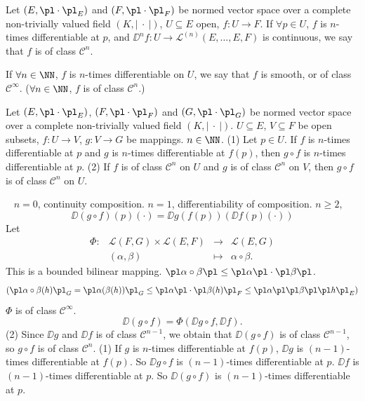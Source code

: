 \begin{definitionenv}
    Let $(E,\pl\cdot\pl_E)$ and $(F,\pl\cdot\pl_F)$ be normed vector space over a complete non-trivially valued field $(K,\left| \ \cdot\ \right|)$, $U\subseteq E$ open, $f:U\longrightarrow F$. If $\forall p\in U$, $f$ is $n$-times differentiable at $p$, and $\DD^n f: U\longrightarrow \mathscr{L}^{(n)}(E,\ldots,E,F)$ is continuous, we say that $f$ is of class $\mathcal{C}^n$.

    \quad If $\forall n\in \NN$, $f$ is $n$-times differentiable on $U$, we say that $f$ is smooth, or of class $\mathcal{C}^\infty$. ($\forall n\in \NN$, $f$ is of class $\mathcal{C}^n$.)
\end{definitionenv}
\begin{propositionenv}
   Let $(E,\pl\cdot\pl_E)$, $(F,\pl\cdot\pl_F)$ and $(G,\pl\cdot\pl_G)$ be normed vector space over a complete non-trivially valued field $(K,\left| \ \cdot\ \right|)$. $U\subseteq E$, $V\subseteq F$ be open subsets, $f: U\longrightarrow V$, $g:V\longrightarrow G$ be mappings. $n\in\NN$.
   \newline
   (1) Let $p\in U$. If $f$ is $n$-times differentiable at $p$ and $g$ is $n$-times differentiable at $f(p)$, then $g\circ f$ is $n$-times differentiable at $p$.
   \newline
   (2) If $f$ is of class $\mathcal{C}^{n}$ on $U$ and $g$ is of class $\mathcal{C}^n$ on $V$, then $g\circ f$ is of class $\mathcal{C}^n$ on $U$.
\end{propositionenv}
\begin{proofenv}[induction on $n$]
    \ \newline
    $n=0$, continuity composition.
    \newline
    $n=1$, differentiability of composition.
    \newline
    $n\ge 2$, 
    $$ \DD (g\circ f)(p)(\cdot)=\DD g(f(p))(\DD f(p)(\cdot))$$
    Let 
    $$\begin{array}{rrcl}
        \Phi:&\mathscr{L}(F,G)\times \mathscr{L}(E,F)&\longrightarrow & \mathscr{L}(E,G)\\
        &(\alpha, \beta)&\longmapsto & \alpha\circ\beta.
    \end{array}$$
    This is a bounded bilinear mapping. $\pl \alpha\circ\beta\pl \le \pl \alpha\pl\cdot\pl\beta\pl$.
    $$(\pl \alpha\circ\beta(h)\pl_G=\pl \alpha(\beta(h))\pl_G\le \pl \alpha\pl\cdot\pl \beta(h)\pl_F\le \pl\alpha\pl\pl \beta\pl\pl h\pl_E)$$
    $\Phi$ is of class $\mathcal{C}^{\infty}$.
    $$ \DD (g\circ f)=\Phi(\DD g\circ f, \DD f).$$
    (2) Since $\DD g$ and $\DD f$ is of class $\mathcal{C}^{n-1}$, we obtain that $\DD (g\circ f)$ is of class $\mathcal{C}^{n-1}$, so $g\circ f$ is of class $\mathcal{C}^{n}$.
    \newline
    (1) If $g$ is $n$-times differentiable at $f(p)$, $\DD g$ is $(n-1)$-times differentiable at $f(p)$. So $\DD g\circ f$ is $(n-1)$-times differentiable at $p$.
    $\DD f$ is $(n-1)$-times differentiable at $p$. So $\DD (g\circ f)$ is $(n-1)$-times differentiable at $p$.
\end{proofenv}

